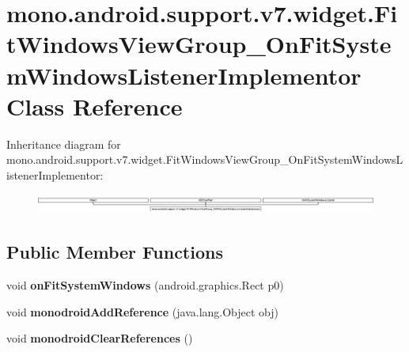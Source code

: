 \hypertarget{classmono_1_1android_1_1support_1_1v7_1_1widget_1_1_fit_windows_view_group___on_fit_system_windows_listener_implementor}{}\section{mono.\+android.\+support.\+v7.\+widget.\+Fit\+Windows\+View\+Group\+\_\+\+On\+Fit\+System\+Windows\+Listener\+Implementor Class Reference}
\label{classmono_1_1android_1_1support_1_1v7_1_1widget_1_1_fit_windows_view_group___on_fit_system_windows_listener_implementor}
Inheritance diagram for mono.\+android.\+support.\+v7.\+widget.\+Fit\+Windows\+View\+Group\+\_\+\+On\+Fit\+System\+Windows\+Listener\+Implementor\+:\begin{figure}[H]
\begin{center}
\leavevmode
\includegraphics[height=0.652681cm]{classmono_1_1android_1_1support_1_1v7_1_1widget_1_1_fit_windows_view_group___on_fit_system_windows_listener_implementor}
\end{center}
\end{figure}
\subsection*{Public Member Functions}
\begin{DoxyCompactItemize}
\item 
\mbox{\label{classmono_1_1android_1_1support_1_1v7_1_1widget_1_1_fit_windows_view_group___on_fit_system_windows_listener_implementor_a3b95f689ada3045b02080434e45c441d}} 
void {\bfseries on\+Fit\+System\+Windows} (android.\+graphics.\+Rect p0)
\item 
\mbox{\label{classmono_1_1android_1_1support_1_1v7_1_1widget_1_1_fit_windows_view_group___on_fit_system_windows_listener_implementor_a49c02a17d05a6addb6953936c6e5f3fd}} 
void {\bfseries monodroid\+Add\+Reference} (java.\+lang.\+Object obj)
\item 
\mbox{\label{classmono_1_1android_1_1support_1_1v7_1_1widget_1_1_fit_windows_view_group___on_fit_system_windows_listener_implementor_af38b0cdcff94bdbd0459c313770f3389}} 
void {\bfseries monodroid\+Clear\+References} ()
\end{DoxyCompactItemize}
